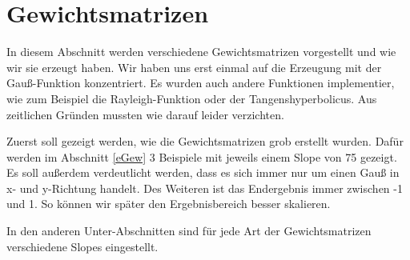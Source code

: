 \section{Gewichtsmatrizen} \label{gewichtsmatrizenSection}
In diesem Abschnitt werden verschiedene Gewichtsmatrizen vorgestellt und wie wir sie erzeugt haben. Wir haben uns erst einmal auf die Erzeugung mit der Gauß-Funktion konzentriert. Es wurden auch andere Funktionen implementier, wie zum Beispiel die Rayleigh-Funktion oder der Tangenshyperbolicus. Aus zeitlichen Gründen mussten wie darauf leider verzichten.

Zuerst soll gezeigt werden, wie die Gewichtsmatrizen grob erstellt wurden. Dafür werden im Abschnitt \ref{eGew} 3 Beispiele mit jeweils einem Slope von 75 gezeigt. Es soll außerdem verdeutlicht werden, dass es sich immer nur um einen Gauß in x- und y-Richtung handelt. Des Weiteren ist das Endergebnis immer zwischen -1 und 1. So können wir später den Ergebnisbereich besser skalieren.

In den anderen Unter-Abschnitten sind für jede Art der Gewichtsmatrizen verschiedene Slopes eingestellt.

\newpage
